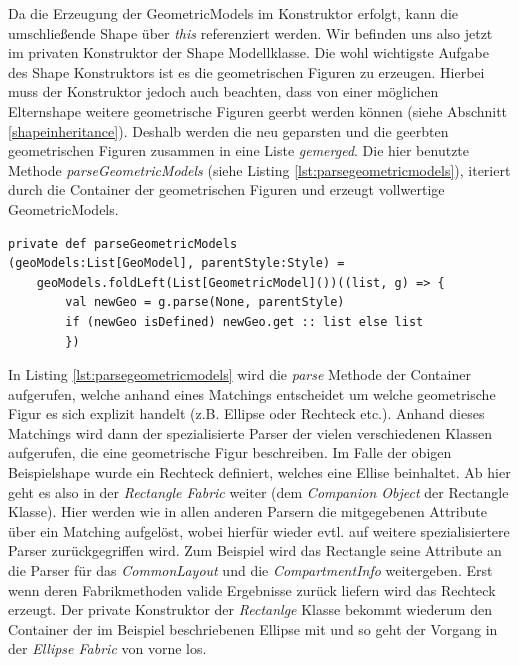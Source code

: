 Da die Erzeugung der GeometricModels im Konstruktor erfolgt, kann die umschließende Shape über \textit{this} referenziert werden. Wir befinden uns also jetzt im privaten Konstruktor der Shape Modellklasse. Die wohl wichtigste Aufgabe des Shape Konstruktors ist es die geometrischen Figuren zu erzeugen. Hierbei muss der Konstruktor jedoch auch beachten, dass von einer möglichen Elternshape weitere geometrische Figuren geerbt werden können (siehe Abschnitt \ref{shapeinheritance}). Deshalb werden die neu geparsten und die geerbten geometrischen Figuren zusammen in eine Liste \textit{gemerged}. Die hier benutzte Methode \textit{parseGeometricModels} (siehe Listing \ref{lst:parsegeometricmodels}), iteriert durch die Container der geometrischen Figuren und erzeugt vollwertige GeometricModels.
\begin{lstlisting}[style = scala, caption = {Auszug aus Code Methode parseGeometricModels}, label = {lst:parsegeometricmodels}]
private def parseGeometricModels
(geoModels:List[GeoModel], parentStyle:Style) =
    geoModels.foldLeft(List[GeometricModel]())((list, g) => {
    	val newGeo = g.parse(None, parentStyle)
    	if (newGeo isDefined) newGeo.get :: list else list
    	})
\end{lstlisting}In Listing \ref{lst:parsegeometricmodels} wird die \textit{parse} Methode der Container aufgerufen, welche anhand eines Matchings entscheidet um welche geometrische Figur es sich explizit handelt (z.B. Ellipse oder Rechteck etc.). Anhand dieses Matchings wird dann der spezialisierte Parser der vielen verschiedenen Klassen aufgerufen, die eine geometrische Figur beschreiben. Im Falle der obigen Beispielshape wurde ein Rechteck definiert, welches eine Ellise beinhaltet. Ab hier geht es also in der \textit{Rectangle Fabric} weiter (dem \textit{Companion Object} der Rectangle Klasse). Hier werden wie in allen anderen Parsern die mitgegebenen Attribute über ein Matching aufgelöst, wobei hierfür wieder evtl. auf weitere spezialisiertere Parser zurückgegriffen wird. Zum Beispiel wird das Rectangle seine Attribute an die Parser für das \textit{CommonLayout} und die \textit{CompartmentInfo} weitergeben. Erst wenn deren Fabrikmethoden valide Ergebnisse zurück liefern wird das Rechteck erzeugt. Der private Konstruktor der \textit{Rectanlge} Klasse bekommt wiederum den Container der im Beispiel beschriebenen Ellipse mit und so geht der Vorgang in der \textit{Ellipse Fabric} von vorne los. 
